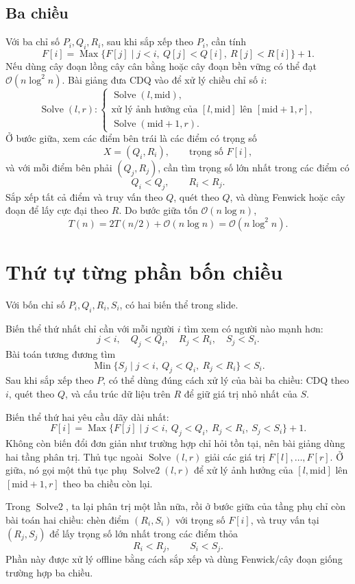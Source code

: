\documentclass[11pt]{article}
\newcommand{\Oh}{\mathcal{O}}
\newcommand{\midp}{\mathrm{mid}}
\newcommand{\Max}{\operatorname{Max}}
\newcommand{\Min}{\operatorname{Min}}
\newcommand{\Solve}{\operatorname{Solve}}
\newcommand{\SolveTwo}{\operatorname{Solve2}}
\begin{document}
\subsection{Ba chiều}

Với ba chỉ số \(P_i,Q_i,R_i\), sau khi sắp xếp theo \(P_i\), cần tính
\[
  F[i]=\Max\{F[j]\mid j<i,\ Q[j]<Q[i],\ R[j]<R[i]\}+1.
\]
Nếu dùng cây đoạn lồng cây cân bằng hoặc cây đoạn bền vững có thể đạt
\(\Oh(n\log^2 n)\). Bài giảng đưa CDQ vào để xử lý chiều chỉ số \(i\):
\[
  \Solve(l,r):
  \begin{cases}
    \Solve(l,\midp),\\
    \text{xử lý ảnh hưởng của }[l,\midp]\text{ lên }[\midp+1,r],\\
    \Solve(\midp+1,r).
  \end{cases}
\]
Ở bước giữa, xem các điểm bên trái là các điểm có trọng số
\[
  X=(Q_i,R_i),\qquad \text{trọng số }F[i],
\]
và với mỗi điểm bên phải \((Q_j,R_j)\), cần tìm trọng số lớn nhất trong các
điểm có
\[
  Q_i<Q_j,\qquad R_i<R_j.
\]
Sắp xếp tất cả điểm và truy vấn theo \(Q\), quét theo \(Q\), và dùng Fenwick
hoặc cây đoạn để lấy cực đại theo \(R\). Do bước giữa tốn \(\Oh(n\log n)\),
\[
  T(n)=2T(n/2)+\Oh(n\log n)=\Oh(n\log^2 n).
\]

\section{Thứ tự từng phần bốn chiều}

Với bốn chỉ số \(P_i,Q_i,R_i,S_i\), có hai biến thể trong slide.

Biến thể thứ nhất chỉ cần với mỗi người \(i\) tìm xem có người nào mạnh hơn:
\[
  j<i,\quad Q_j<Q_i,\quad R_j<R_i,\quad S_j<S_i.
\]
Bài toán tương đương tìm
\[
  \Min\{S_j\mid j<i,\ Q_j<Q_i,\ R_j<R_i\}<S_i.
\]
Sau khi sắp xếp theo \(P\), có thể dùng đúng cách xử lý của bài ba chiều:
CDQ theo \(i\), quét theo \(Q\), và cấu trúc dữ liệu trên \(R\) để giữ giá
trị nhỏ nhất của \(S\).

Biến thể thứ hai yêu cầu dãy dài nhất:
\[
  F[i]=\Max\{F[j]\mid j<i,\ Q_j<Q_i,\ R_j<R_i,\ S_j<S_i\}+1.
\]
Không còn biến đổi đơn giản như trường hợp chỉ hỏi tồn tại, nên bài giảng
dùng hai tầng phân trị. Thủ tục ngoài \(\Solve(l,r)\) giải các giá trị
\(F[l],\ldots,F[r]\). Ở giữa, nó gọi một thủ tục phụ \(\SolveTwo(l,r)\) để
xử lý ảnh hưởng của \([l,\midp]\) lên \([\midp+1,r]\) theo ba chiều còn lại.

Trong \(\SolveTwo\), ta lại phân trị một lần nữa, rồi ở bước giữa của tầng
phụ chỉ còn bài toán hai chiều: chèn điểm \((R_i,S_i)\) với trọng số
\(F[i]\), và truy vấn tại \((R_j,S_j)\) để lấy trọng số lớn nhất trong các
điểm thỏa
\[
  R_i<R_j,\qquad S_i<S_j.
\]
Phần này được xử lý offline bằng cách sắp xếp và dùng Fenwick/cây đoạn giống
trường hợp ba chiều.
\end{document}
